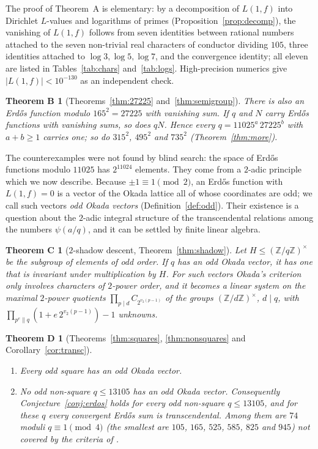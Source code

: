 \documentclass[11pt]{amsart}
\newtheorem*{mainB}{Theorem B}
\newtheorem*{mainC}{Theorem C}
\newtheorem*{mainD}{Theorem D}
\theoremstyle{definition}
\theoremstyle{remark}
\providecommand{\Z}{\mathbb Z}
\numberwithin{equation}{section}
\begin{document}
The proof of Theorem~A is elementary: by a decomposition of $L(1,f)$ into Dirichlet $L$-values and logarithms of primes (Proposition~\ref{prop:decomp}), the vanishing of $L(1,f)$ follows from seven identities between rational numbers attached to the seven non-trivial real characters of conductor dividing $105$, three identities attached to $\log 3,\log5,\log7$, and the convergence identity; all eleven are listed in Tables~\ref{tab:chars} and~\ref{tab:logs}.
High-precision numerics give $|L(1,f)|<10^{-130}$ as an independent check.

\begin{mainB}[Theorems~\ref{thm:27225} and~\ref{thm:semigroup}]
There is also an Erd\H{o}s function modulo $165^2=27225$ with vanishing sum.
If $q$ and $N$ carry Erd\H{o}s functions with vanishing sums, so does $qN$.
Hence every $q=11025^a\,27225^b$ with $a+b\ge1$ carries one; so do $315^2$, $495^2$ and $735^2$ (Theorem~\ref{thm:more}).
\end{mainB}

The counterexamples were not found by blind search: the space of Erd\H{o}s functions modulo $11025$ has $2^{11024}$ elements.
They come from a $2$-adic principle which we now describe.
Because $\pm1\equiv1\pmod2$, an Erd\H{o}s function with $L(1,f)=0$ is a vector of the Okada lattice all of whose coordinates are odd; we call such vectors \emph{odd Okada vectors} (Definition~\ref{def:odd}).
Their existence is a question about the $2$-adic integral structure of the transcendental relations among the numbers $\psi(a/q)$, and it can be settled by finite linear algebra.

\begin{mainC}[$2$-shadow descent, Theorem~\ref{thm:shadow}]
Let $H\le(\Z/q\Z)^\times$ be the subgroup of elements of odd order.
If $q$ has an odd Okada vector, it has one that is invariant under multiplication by $H$.
For such vectors Okada's criterion only involves characters of $2$-power order, and it becomes a linear system on the maximal $2$-power quotients $\prod_{p\mid d}C_{2^{v_2(p-1)}}$ of the groups $(\Z/d\Z)^\times$, $d\mid q$, with $\prod_{p^e\parallel q}(1+e\,2^{v_2(p-1)})-1$ unknowns.
\end{mainC}

\begin{mainD}[Theorems~\ref{thm:squares}, \ref{thm:nonsquares} and Corollary~\ref{cor:transc}]
\begin{enumerate}
\item Every odd square has an odd Okada vector.
\item No odd non-square $q\le 13105$ has an odd Okada vector. Consequently Conjecture~\ref{conj:erdos} holds for every odd non-square $q\le13105$, and for these $q$ every convergent Erd\H{o}s sum is transcendental. Among them are $74$ moduli $q\equiv1\pmod 4$ (the smallest are $105$, $165$, $525$, $585$, $825$ and $945$) not covered by the criteria of \cite{BBW73,Oka82,MS10,CM15,Bha22}.
\end{enumerate}
\end{mainD}
\end{document}
